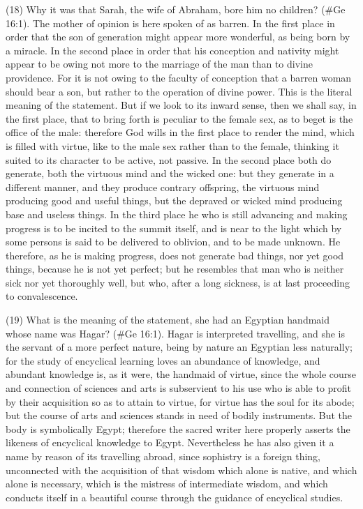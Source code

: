 (18) Why it was that Sarah, the wife of Abraham, bore him no children? (\#Ge 16:1). The
mother of opinion is here spoken of as barren. In the first place in order that the son of generation
might appear more wonderful, as being born by a miracle. In the second place in order that his
conception and nativity might appear to be owing not more to the marriage of the man than to
divine providence. For it is not owing to the faculty of conception that a barren woman should bear
a son, but rather to the operation of divine power. This is the literal meaning of the statement. But if
we look to its inward sense, then we shall say, in the first place, that to bring forth is peculiar to the
female sex, as to beget is the office of the male: therefore God wills in the first place to render the
mind, which is filled with virtue, like to the male sex rather than to the female, thinking it suited to its
character to be active, not passive. In the second place both do generate, both the virtuous mind
and the wicked one: but they generate in a different manner, and they produce contrary offspring,
the virtuous mind producing good and useful things, but the depraved or wicked mind producing
base and useless things. In the third place he who is still advancing and making progress is to be
incited to the summit itself, and is near to the light which by some persons is said to be delivered to
oblivion, and to be made unknown. He therefore, as he is making progress, does not generate bad
things, nor yet good things, because he is not yet perfect; but he resembles that man who is neither
sick nor yet thoroughly well, but who, after a long sickness, is at last proceeding to convalescence.

(19) What is the meaning of the statement, she had an Egyptian handmaid whose name was
Hagar? (\#Ge 16:1). Hagar is interpreted travelling, and she is the servant of a more perfect
nature, being by nature an Egyptian less naturally; for the study of encyclical learning loves an
abundance of knowledge, and abundant knowledge is, as it were, the handmaid of virtue, since the
whole course and connection of sciences and arts is subservient to his use who is able to profit by
their acquisition so as to attain to virtue, for virtue has the soul for its abode; but the course of arts
and sciences stands in need of bodily instruments. But the body is symbolically Egypt; therefore
the sacred writer here properly asserts the likeness of encyclical knowledge to Egypt.
Nevertheless he has also given it a name by reason of its travelling abroad, since sophistry is a
foreign thing, unconnected with the acquisition of that wisdom which alone is native, and which
alone is necessary, which is the mistress of intermediate wisdom, and which conducts itself in a
beautiful course through the guidance of encyclical studies.

